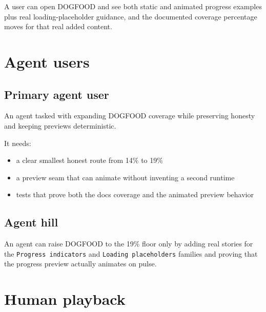 A user can open DOGFOOD and see both static and animated progress examples plus real loading-placeholder guidance, and the documented coverage percentage moves for that real added content.

\section{Agent users}\label{record-067-agent-users}

\subsection{Primary agent user}\label{record-067-primary-agent-user}

An agent tasked with expanding DOGFOOD coverage while preserving honesty and keeping previews deterministic.

It needs:

\begin{itemize}
\tightlist
\item
  a clear smallest honest route from 14\% to 19\%
\item
  a preview seam that can animate without inventing a second runtime
\item
  tests that prove both the docs coverage and the animated preview behavior
\end{itemize}

\subsection{Agent hill}\label{record-067-agent-hill}

An agent can raise DOGFOOD to the 19\% floor only by adding real stories for the \texttt{P\allowbreak{}r\allowbreak{}o\allowbreak{}g\allowbreak{}r\allowbreak{}e\allowbreak{}s\allowbreak{}s\allowbreak{} \allowbreak{}i\allowbreak{}n\allowbreak{}d\allowbreak{}i\allowbreak{}c\allowbreak{}a\allowbreak{}t\allowbreak{}o\allowbreak{}r\allowbreak{}s} and \texttt{L\allowbreak{}o\allowbreak{}a\allowbreak{}d\allowbreak{}i\allowbreak{}n\allowbreak{}g\allowbreak{} \allowbreak{}p\allowbreak{}l\allowbreak{}a\allowbreak{}c\allowbreak{}e\allowbreak{}h\allowbreak{}o\allowbreak{}l\allowbreak{}d\allowbreak{}e\allowbreak{}r\allowbreak{}s} families and proving that the progress preview actually animates on pulse.

\section{Human playback}\label{record-067-human-playback}

